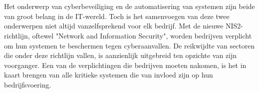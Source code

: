
%
%
%
%
%

%



\chapter*{}

Het onderwerp van cyberbeveiliging en de automatisering van systemen zijn beide van groot belang in de IT-wereld.
Toch is het samenvoegen van deze twee onderwerpen niet altijd vanzelfsprekend voor elk bedrijf.
Met de nieuwe NIS2-richtlijn, oftewel "Network and Information Security", worden bedrijven verplicht om hun systemen te beschermen tegen cyberaanvallen.
De reikwijdte van sectoren die onder deze richtlijn vallen, is aanzienlijk uitgebreid ten opzichte van zijn voorganger.
Een van de verplichtingen die bedrijven moeten nakomen, is het in kaart brengen van alle kritieke systemen die van invloed zijn op hun bedrijfsvoering.

